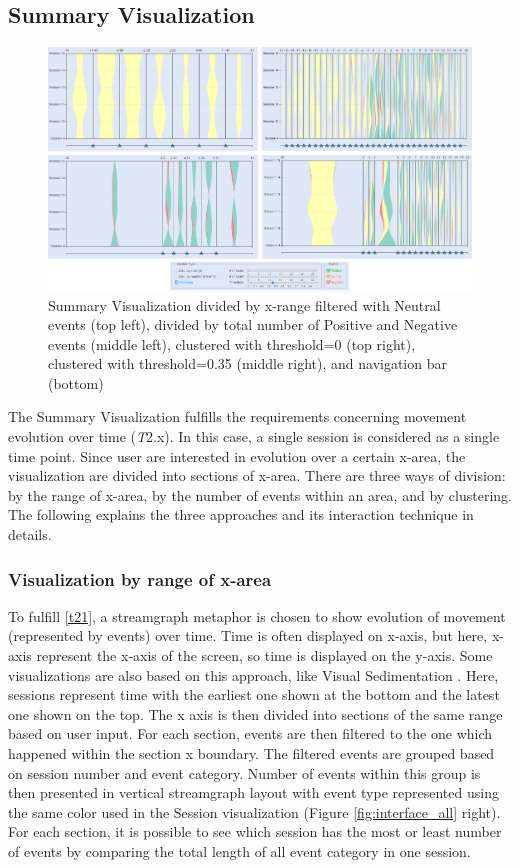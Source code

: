 \documentclass{vgtc}                          %
\begin{document}
\subsection{Summary Visualization}
\begin{figure}
	\centering
	\includegraphics[width=180mm]{images/case_study_all2.png}
	\caption{Summary Visualization divided by x-range filtered with Neutral events (top left), divided by total number of Positive and Negative events (middle left), clustered with threshold=0 (top right), clustered with threshold=0.35 (middle right), and navigation bar (bottom)}
	\label{fig:case_study_all}
\end{figure}
The Summary Visualization fulfills the requirements concerning movement evolution over time (\textit{T}2.x). In this case, a single session is considered as a single time point. Since user are interested in evolution over a certain x-area, the visualization are divided into sections of x-area. There are three ways of division: by the range of x-area, by the number of events within an area, and by clustering. The following explains the three approaches and its interaction technique in details.

\subsubsection{Visualization by range of x-area}
To fulfill \ref{t21}, a streamgraph metaphor is chosen to show evolution of movement (represented by events) over time. Time is often displayed on x-axis, but here, x-axis represent the x-axis of the screen, so time is displayed on the y-axis. Some visualizations are also based on this approach, like Visual Sedimentation \cite{huron}. Here, sessions represent time with the earliest one shown at the bottom and the latest one shown on the top. The x axis is then divided into sections of the same range based on user input. For each section, events are then filtered to the one which happened within the section x boundary. The filtered events are grouped based on session number and event category. Number of events within this group is then presented in vertical streamgraph layout with event type represented using the same color used in the Session visualization (Figure  \ref{fig:interface_all} right). For each section, it is possible to see which session has the most or least number of events by comparing the total length of all event category in one session. 
\end{document}
